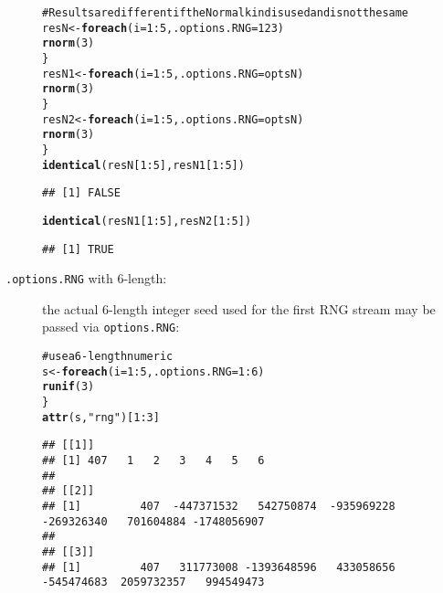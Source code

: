 \documentclass[a4paper,12pt]{article}\usepackage{graphicx, color}
\makeatletter
\newcommand{\hlfunctioncall}[1]{\textcolor[rgb]{0.501960784313725,0,0.329411764705882}{\textbf{#1}}}%
\newcommand{\hlstring}[1]{\textcolor[rgb]{0.6,0.6,1}{#1}}%
\newcommand{\hlcomment}[1]{\textcolor[rgb]{0.180392156862745,0.6,0.341176470588235}{#1}}%
\newenvironment{kframe}{%
 \def\at@end@of@kframe{}%
 \ifinner\ifhmode%
  \def\at@end@of@kframe{\end{minipage}}%
  \begin{minipage}{\columnwidth}%
 \fi\fi%
 \def\FrameCommand##1{\hskip\@totalleftmargin \hskip-\fboxsep
 \colorbox{shadecolor}{##1}\hskip-\fboxsep
     \hskip-\linewidth \hskip-\@totalleftmargin \hskip\columnwidth}%
 \MakeFramed {\advance\hsize-\width
   \@totalleftmargin\z@ \linewidth\hsize
   \@setminipage}}%
 {\par\unskip\endMakeFramed%
 \at@end@of@kframe}
\newenvironment{knitrout}{}{} %
\renewenvironment{knitrout}{\begin{footnotesize}}{\end{footnotesize}}
\let\code=\texttt
\makeatother
\begin{document}
\begin{description}
\begin{knitrout}
\begin{kframe}
\begin{alltt}
\hlcomment{# Results are different if the Normal kind is used and is not the same}
resN <- \hlfunctioncall{foreach}(i = 1:5, .options.RNG = 123) %dorng% \{
    \hlfunctioncall{rnorm}(3)
\}
resN1 <- \hlfunctioncall{foreach}(i = 1:5, .options.RNG = optsN) %dorng% \{
    \hlfunctioncall{rnorm}(3)
\}
resN2 <- \hlfunctioncall{foreach}(i = 1:5, .options.RNG = optsN) %dorng% \{
    \hlfunctioncall{rnorm}(3)
\}
\hlfunctioncall{identical}(resN[1:5], resN1[1:5])
\end{alltt}
\begin{verbatim}
## [1] FALSE
\end{verbatim}
\begin{alltt}
\hlfunctioncall{identical}(resN1[1:5], resN2[1:5])
\end{alltt}
\begin{verbatim}
## [1] TRUE
\end{verbatim}
\end{kframe}
\end{knitrout}

\item[\code{.options.RNG} with 6-length:] the actual 6-length integer seed used
for the first RNG stream may be passed via \code{options.RNG}: 
\begin{knitrout}
\color{fgcolor}\begin{kframe}
\begin{alltt}
\hlcomment{# use a 6-length numeric}
s <- \hlfunctioncall{foreach}(i = 1:5, .options.RNG = 1:6) %dorng% \{
    \hlfunctioncall{runif}(3)
\}
\hlfunctioncall{attr}(s, \hlstring{"rng"})[1:3]
\end{alltt}
\begin{verbatim}
## [[1]]
## [1] 407   1   2   3   4   5   6
## 
## [[2]]
## [1]         407  -447371532   542750874  -935969228  -269326340   701604884 -1748056907
## 
## [[3]]
## [1]         407   311773008 -1393648596   433058656  -545474683  2059732357   994549473
\end{verbatim}
\end{kframe}
\end{knitrout}


\end{description}
\end{document}
